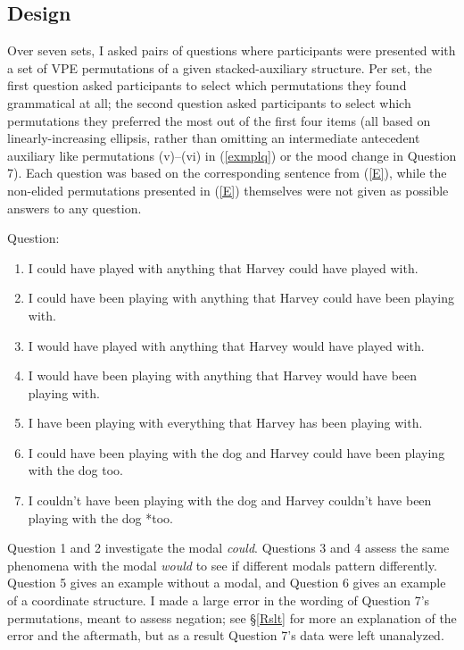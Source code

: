 \documentclass[11pt, oneside]{article}
\begin{document}
\subsection{Design}

Over seven sets, I asked pairs of questions where participants were presented with a set of VPE permutations of a given stacked-auxiliary structure. Per set, the first question asked participants to select which permutations they found grammatical at all; the second question asked participants to select which permutations they preferred the most out of the first four items (all based on linearly-increasing ellipsis, rather than omitting an intermediate antecedent auxiliary like permutations (v)--(vi) in (\ref{exmplq}) or the mood change in Question 7). Each question was based on the corresponding sentence from (\ref{E}), while the non-elided permutations presented in (\ref{E}) themselves were not given as possible answers to any question.

\begin{exe}
\ex\label{E} Question:
\begin{enumerate}
\item I could have played with anything that Harvey could have played with.
\item I could have been playing with anything that Harvey could have been playing with.
\item I would have played with anything that Harvey would have played with.
\item I would have been playing with anything that Harvey would have been playing with. 
\item I have been playing with everything that Harvey has been playing with.
\item I could have been playing with the dog and Harvey could have been playing with the dog too.
\item I couldn't have been playing with the dog and Harvey couldn't have been playing with the dog *too.
\end{enumerate}
\end{exe}

Question 1 and 2 investigate the modal \textit{could}. Questions 3 and 4 assess the same phenomena with the modal \textit{would} to see if different modals pattern differently. Question 5 gives an example without a modal, and Question 6 gives an example of a coordinate structure. I made a large error in the wording of Question 7's permutations, meant to assess negation; see \S\ref{Rslt} for more an explanation of the error and the aftermath, but as a result Question 7's data were left unanalyzed.
\end{document}
